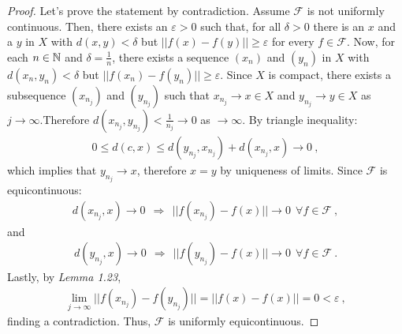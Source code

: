 \begin{questions}


\begin{solution}
  \begin{proof}
  Let's prove the statement by contradiction. Assume $\mathcal{F}$ is not uniformly continuous. Then, there exists an $\varepsilon >0$ such that, for all $\delta >0$ there is an $x$ and a $y$ in $X$ with $d(x,y)<\delta$ but $||f(x)-f(y)||\geq\varepsilon$ for every $f\in\mathcal{F}$. Now, for each $n\in\mathbb{N}$ and $\delta=\frac{1}{n}$, there exists a sequence $(x_n)$ and $(y_n)$ in $X$ with $d(x_n,y_n)<\delta$ but $||f(x_n)-f(y_n)||\geq\varepsilon$. Since $X$ is compact, there exists a subsequence $(x_{n_j})$ and $(y_{n_j})$ such that $x_{n_j}\rightarrow x\in X$ and $y_{n_j}\rightarrow y\in X$ as $j\rightarrow\infty$.Therefore $d(x_{n_j},y_{n_j})<\frac{1}{n_j}\rightarrow 0$ as $\rightarrow\infty$. By triangle inequality:
  \begin{align*}
  0\leq d(c,x)\leq d(y_{n_j},x_{n_j})+d(x_{n_j},x)\rightarrow 0~,
  \end{align*}
  which implies that $y_{n_j}\rightarrow x$, therefore $x=y$ by uniqueness of limits. Since $\mathcal{F}$ is equicontinuous:
  \begin{align*}
  d(x_{n_j},x)\rightarrow 0~~\Rightarrow~~||f(x_{n_j})-f(x)||\rightarrow 0~~\forall f\in\mathcal{F}~,
  \end{align*}
and
    \begin{align*}
  d(y_{n_j},x)\rightarrow 0~~\Rightarrow~~||f(y_{n_j})-f(x)||\rightarrow 0~~\forall f\in\mathcal{F}~.
  \end{align*}
Lastly, by \textit{Lemma 1.23},
\begin{align*}
\lim_{j\rightarrow\infty}||f(x_{n_j})-f(y_{n_j})||= ||f(x)-f(x)||=0<\varepsilon~,
\end{align*}
finding a contradiction. Thus, $\mathcal{F}$ is uniformly equicontinuous.
  \end{proof}
\end{solution}


\end{questions}